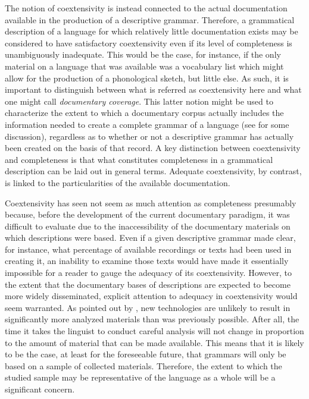 \documentclass[12pt]{article}
\newcommand\namecite{\citet}
\begin{document}
The notion of coextensivity is instead connected to the actual documentation
available in the production of a descriptive grammar. Therefore, a grammatical
description of a language for which relatively little documentation exists may
be considered to have satisfactory coextensivity even if its level of
completeness is unambiguously inadequate. This would be the case, for instance,
if the only material on a language that was available was a vocabulary list
which might allow for the production of a phonological sketch, but little else.
As such, it is important to distinguish between what is referred as
coextensivity here and what one might call \emph{documentary coverage}. This
latter notion might be used to characterize the extent to which a documentary
corpus actually includes the information needed to create a complete grammar of
a language (see \namecite{Berge:2010} for some discussion), regardless as to
whether or not a descriptive grammar has actually been created on the basis of
that record. A key distinction between coextensivity and completeness is that
what constitutes completeness in a grammatical description can be laid out in
general terms. Adequate coextensivity, by contrast, is linked to the
particularities of the available documentation.

Coextensivity has seen not seem as much attention as completeness presumably
because, before the development of the current documentary paradigm, it was
difficult to evaluate due to the inaccessibility of the documentary materials on
which descriptions were based. Even if a given descriptive grammar made clear,
for instance, what percentage of available recordings or texts had been used in
creating it, an inability to examine those texts would have made it essentially
impossible for a reader to gauge the adequacy of its coextensivity. However, to
the extent that the documentary bases of descriptions are expected to become
more widely disseminated, explicit attention to adequacy in coextensivity would
seem warranted. As pointed out by \namecite[25]{EvansDench:2006}, new
technologies are unlikely to result in significantly more analyzed materials
than was previously possible. After all, the time it takes the linguist to
conduct careful analysis will not change in proportion to the amount of material
that can be made available. This means that it is likely to be the case, at
least for the foreseeable future, that grammars will only be based on a sample
of collected materials. Therefore, the extent to which the studied sample may be
representative of the language as a whole will be a significant concern.
\end{document}
